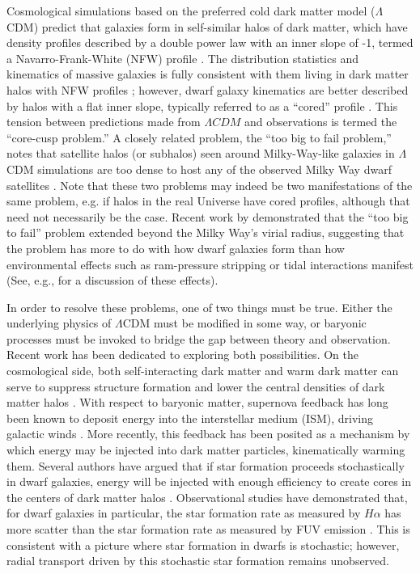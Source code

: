 \documentclass[iop]{emulateapj}
\begin{document}
Cosmological simulations based on the preferred cold dark matter model ($\Lambda$CDM) predict that galaxies form in self-similar halos of dark matter, which have density profiles described by a double power law with an inner slope of -1, termed a Navarro-Frank-White (NFW) profile \citep{NFW}. The distribution statistics and kinematics of massive galaxies is fully consistent with them living in dark matter halos with NFW profiles \citep{Wambsganss04,Springel05,BK09,Klypin11}; however, dwarf galaxy kinematics are better described by halos with a flat inner slope, typically referred to as a ``cored'' profile \citep{Moore94,McGaugh01,Marchesini02,Simon05,deblok08}. This tension between predictions made from $\Lambda CDM$ and observations is termed the ``core-cusp problem.'' A closely related problem, the ``too big to fail problem,''  notes that satellite halos (or subhalos) seen around Milky-Way-like galaxies in $\Lambda$CDM simulations are too dense to host any of the observed Milky Way dwarf satellites \citep{BK11,BK12}. Note that these two problems may indeed be two manifestations of the same problem, e.g. if halos in the real Universe have cored profiles, although that need not necessarily be the case. Recent work by \cite{GK14} demonstrated that the ``too big to fail'' problem extended beyond the Milky Way's virial radius, suggesting that the problem has more to do with how dwarf galaxies form than how environmental effects such as ram-pressure stripping or tidal interactions manifest (See, e.g., \cite{Gunn72,Larson80,Farouki81,Moore96,Balogh2000} for a discussion of these effects).

In order to resolve these problems, one of two things must be true. Either the underlying physics of $\Lambda$CDM must be modified in some way, or baryonic processes must be invoked to bridge the gap between theory and observation. Recent work has been dedicated to exploring both possibilities. On the cosmological side, both self-interacting dark matter and warm dark matter can serve to suppress structure formation and lower the central densities of dark matter halos \citep{Lovell14,Elbert14}. With respect to baryonic matter, supernova feedback has long been known to deposit energy into the interstellar medium (ISM), driving galactic winds \citep{Larson74,Dekel86}. More recently, this feedback has been posited as a mechanism by which energy may be injected into dark matter particles, kinematically warming them. Several authors have argued that if star formation proceeds stochastically in dwarf galaxies, energy will be injected with enough efficiency to create cores in the centers of dark matter halos \citep{Governato10,Governato12,PG12}. Observational studies have demonstrated that, for dwarf galaxies in particular, the star formation rate as measured by $H\alpha$ has more scatter than the star formation rate as measured by FUV emission \citep{Sullivan00,Boselli09,Shivaei15,Guo16,Sparre17}. This is consistent with a picture where star formation in dwarfs is stochastic; however, radial transport driven by this stochastic star formation remains unobserved.
\end{document}
